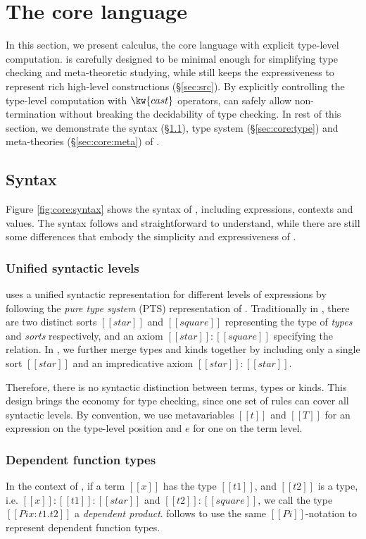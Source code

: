 \section{The core language}\label{sec:core}

In this section, we present \name calculus, the core language with explicit type-level computation. \name is carefully designed to be minimal enough for simplifying type checking and meta-theoretic studying, while still keeps the expressiveness to represent rich high-level constructions (\S \ref{sec:src}). By explicitly controlling the type-level computation with $\kw{cast}$ operators, \name can safely allow non-termination without breaking the decidability of type checking. In rest of this section, we demonstrate the syntax (\S \ref{sec:core:syn}), type system (\S \ref{sec:core:type}) and meta-theories (\S \ref{sec:core:meta}) of \name.

\subsection{Syntax}\label{sec:core:syn}
Figure \ref{fig:core:syntax} shows the syntax of \name, including expressions, contexts and values. The syntax follows \cc and straightforward to understand, while there are still some differences that embody the simplicity and expressiveness of \name.

\subsubsection{Unified syntactic levels}
\name uses a unified syntactic representation for different levels of expressions by following the \emph{pure type system} (PTS) representation of \cc. Traditionally in \cc, there are two distinct sorts $[[star]]$ and $[[square]]$ representing the type of \emph{types} and \emph{sorts} respectively, and an axiom $[[star]]:[[square]]$ specifying the relation. In \name, we further merge types and kinds together by including only a single sort $[[star]]$ and an impredicative axiom $[[star]]:[[star]]$. 

Therefore, there is no syntactic distinction between terms, types or kinds. This design brings the economy for type checking, since one set of rules can cover all syntactic levels. By convention, we use metavariables $[[t]]$ and $[[T]]$ for an expression on the type-level position and $e$ for one on the term level.

\subsubsection{Dependent function types}
In the context of \cc, if a term $[[x]]$ has the type $[[t1]]$, and $[[t2]]$ is a type, i.e. $[[x]]:[[t1]]:[[star]]$ and $[[t2]]:[[square]]$, we call the type $[[Pi x:t1.t2]]$ a \emph{dependent product}. \name follows \cc to use the same $[[Pi]]$-notation to represent dependent function types.


